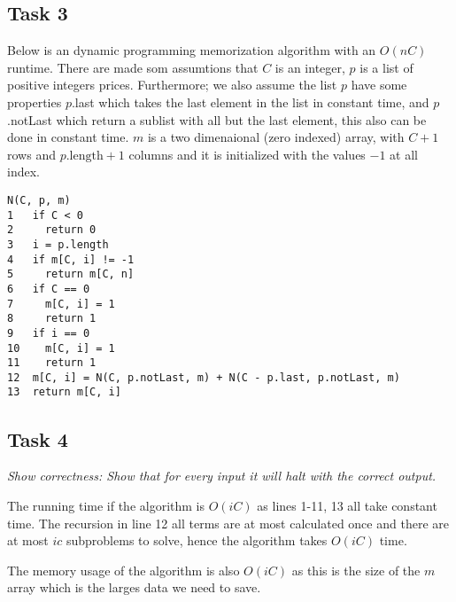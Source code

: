 \documentclass{report}
\begin{document}
\subsection*{Task 3}
Below is an dynamic programming memorization  algorithm with an $O(nC)$ runtime. There are made som assumtions that $C$ is an integer, $p$ is a list of positive integers prices. Furthermore; we also assume the list $p$ have some properties $p$.last which takes the last element in the list in constant time, and $p$.notLast which return a sublist with all but the last element, this also can be done in constant time.  $m$ is a two dimenaional (zero indexed) array, with $C+1$ rows and $p\text{.length}+1$ columns and it is initialized with the values $-1$ at all index.
\begin{lstlisting}[frame=single]
N(C, p, m)
1   if C < 0
2     return 0
3   i = p.length
4   if m[C, i] != -1
5     return m[C, n]
6   if C == 0
7     m[C, i] = 1
8     return 1
9   if i == 0
10    m[C, i] = 1
11    return 1
12  m[C, i] = N(C, p.notLast, m) + N(C - p.last, p.notLast, m)
13  return m[C, i]
\end{lstlisting}

\subsection*{Task 4}
\emph{Show correctness: Show that for every input it will halt with the correct output.}

The running time if the algorithm is $O(iC)$ as lines 1-11, 13 all take constant time. The recursion in line 12 all terms are at most calculated once and there are at most $ic$ subproblems to solve, hence the algorithm takes $O(iC)$ time.

The memory usage of the algorithm is also $O(iC)$ as this is the size of the $m$ array which is the larges data we need to save. 
\end{document}

